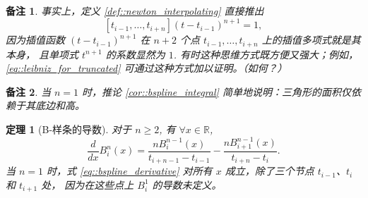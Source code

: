 \documentclass[a4paper]{ctexart}
\newtheorem{theorem}{定理}
\newtheorem{remark}{备注}
\numberwithin{theorem}{section}
\numberwithin{equation}{section}
\numberwithin{figure}{section}
\numberwithin{remark}{section}
\begin{document}
\begin{remark}
事实上，定义 \ref{def::newton_interpolating} 直接推出
\[
[t_{i-1}, \ldots, t_{i+n}] (t - t_{i-1})^{n+1} = 1,
\]
因为插值函数 $(t - t_{i-1})^{n+1}$ 在 $n+2$ 个点 $t_{i-1}, \ldots, t_{i+n}$ 上的插值多项式就是其本身，
且单项式 $t^{n+1}$ 的系数显然为 $1$. 有时这种思维方式既方便又强大；例如，\eqref{eq::leibniz_for_truncated} 可通过这种方式加以证明。（如何？）
\end{remark}

\begin{remark}
当 $n = 1$ 时，推论 \ref{cor::bspline_integral} 简单地说明：三角形的面积仅依赖于其底边和高。
\end{remark}

\begin{theorem}[B-样条的导数]
\label{thm::bspline_derivative}
对于 $n \geq 2$, 有 $\forall x \in \mathbb{R}$,
\begin{equation}
\label{eq::bspline_derivative}
\frac{d}{dx} B_i^n(x) = \frac{n B_i^{n-1}(x)}{t_{i+n-1} - t_{i-1}} - \frac{n B_{i+1}^{n-1}(x)}{t_{i+n} - t_i}. 
\end{equation}
当 $n = 1$ 时，式 \eqref{eq::bspline_derivative} 对所有 $x$ 成立，除了三个节点 $t_{i-1}$、$t_i$ 和 $t_{i+1}$ 处，
因为在这些点上 $B_i^1$ 的导数未定义。
\end{theorem}
\end{document}
